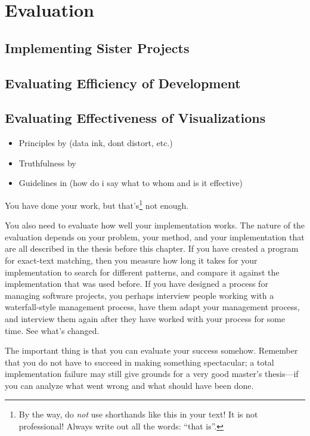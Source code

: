 
\chapter{Evaluation}
\label{chapter:evaluation}

\section{Implementing Sister Projects}

\section{Evaluating Efficiency of Development}

\section{Evaluating Effectiveness of Visualizations}

\begin{itemize}
	\item Principles by \citet{tufte_visual_1986} (data ink, dont distort, etc.)
	\item Truthfulness by \citet{azzam_j-b_2013}
	\item Guidelines in \citet{kraak_cartographic_1998} (how do i say what to whom and is it effective)
\end{itemize}

You have done your work, but that's\footnote{By the way, do \emph{not} use
shorthands like this in your text! It is not professional! Always write out all
the words: ``that is''.} not enough. 

You also need to evaluate how well your implementation works.  The
nature of the evaluation depends on your problem, your method, and
your implementation that are all described in the thesis before this
chapter.  If you have created a program for exact-text matching, then
you measure how long it takes for your implementation to search for
different patterns, and compare it against the implementation that was
used before.  If you have designed a process for managing software
projects, you perhaps interview people working with a waterfall-style
management process, have them adapt your management process, and
interview them again after they have worked with your process for some
time. See what's changed.

The important thing is that you can evaluate your success somehow.
Remember that you do not have to succeed in making something spectacular; a
total implementation failure may still give grounds for a very good master's
thesis---if you can analyze what went wrong and what should have been done.

 
